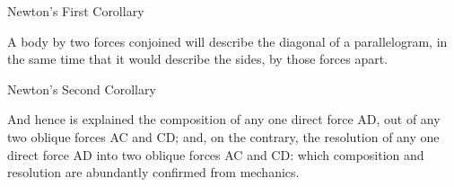 \documentclass[avery5371,grid]{flashcards}
\begin{document}
\begin{flashcard}[Application]{Newton's First Corollary}
\vspace{\fill}
\begin{minipage}{0.60\linewidth}
    A body by two forces conjoined will describe the diagonal of a parallelogram, in the same time that it would describe the sides, by those forces apart.\cite{NaturalPhilosophy}
\end{minipage}
\begin{minipage}{0.35\linewidth}
\begin{center}
\end{center}
\vspace{\fill}
\end{minipage}
\end{flashcard}


\begin{flashcard}[Application]{Newton's Second Corollary}
\vspace{\fill}
\begin{minipage}{0.60\linewidth}
    And hence is explained the composition of any one direct force AD, out of any two oblique forces AC and CD; and, on the contrary, the resolution of any one direct force AD into two oblique forces AC and CD: which composition and resolution are abundantly confirmed from mechanics.\cite{NaturalPhilosophy}
\end{minipage}
\begin{minipage}{0.38\linewidth}
\vspace{\fill}
\begin{center}
\end{center}
\vspace{\fill}
\end{minipage}
\end{flashcard}
\end{document}
